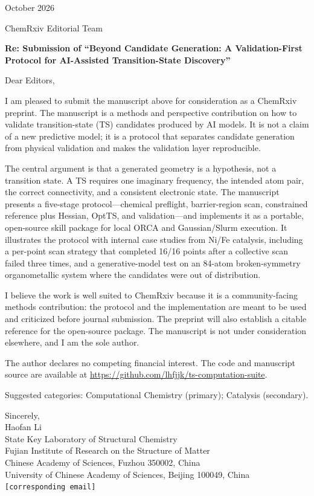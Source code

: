 \documentclass[11pt,a4paper]{article}
\begin{document}
\begin{flushright}
October 2026
\end{flushright}

\noindent
ChemRxiv Editorial Team

\vspace{1.2em}
\noindent
\textbf{Re: Submission of ``Beyond Candidate Generation: A Validation-First Protocol for AI-Assisted Transition-State Discovery''}

\vspace{0.6em}
Dear Editors,

I am pleased to submit the manuscript above for consideration as a ChemRxiv
preprint. The manuscript is a methods and perspective contribution on how to
validate transition-state (TS) candidates produced by AI models. It is not a
claim of a new predictive model; it is a protocol that separates candidate
generation from physical validation and makes the validation layer
reproducible.

The central argument is that a generated geometry is a hypothesis, not a
transition state. A TS requires one imaginary frequency, the intended atom
pair, the correct connectivity, and a consistent electronic state. The
manuscript presents a five-stage protocol---chemical preflight, barrier-region
scan, constrained reference plus Hessian, OptTS, and validation---and implements it as
a portable, open-source skill package for local ORCA and Gaussian/Slurm
execution. It illustrates the protocol with internal case studies from Ni/Fe
catalysis, including a per-point scan strategy that completed 16/16 points
after a collective scan failed three times, and a generative-model test on an
84-atom broken-symmetry organometallic system where the candidates were out of
distribution.

I believe the work is well suited to ChemRxiv because it is a community-facing
methods contribution: the protocol and the implementation are meant to be used
and criticized before journal submission. The preprint will also establish a
citable reference for the open-source package. The manuscript is not under
consideration elsewhere, and I am the sole author.

The author declares no competing financial interest. The code and manuscript source are available at \url{https://github.com/lhfjjk/ts-computation-suite}.

Suggested categories: Computational Chemistry (primary); Catalysis (secondary).

\vspace{1.0em}
\noindent
Sincerely,\\[0.8em]
Haofan Li\\
State Key Laboratory of Structural Chemistry\\
Fujian Institute of Research on the Structure of Matter\\
Chinese Academy of Sciences, Fuzhou 350002, China\\
University of Chinese Academy of Sciences, Beijing 100049, China\\
\texttt{[corresponding email]}
\end{document}
